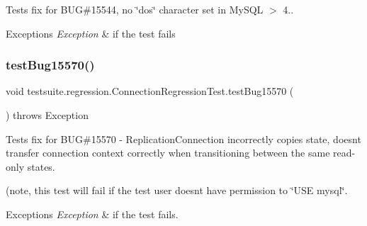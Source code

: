 Tests fix for B\+UG\#15544, no \char`\"{}dos\char`\"{} character set in My\+S\+QL $>$ 4..


\begin{DoxyExceptions}{Exceptions}
{\em Exception} & if the test fails \\
\hline
\end{DoxyExceptions}
\mbox{\label{classtestsuite_1_1regression_1_1_connection_regression_test_a9a041d23bb6273cd7e366bede52eea56}} 
\subsubsection{\texorpdfstring{test\+Bug15570()}{testBug15570()}}
{\footnotesize\ttfamily void testsuite.\+regression.\+Connection\+Regression\+Test.\+test\+Bug15570 (\begin{DoxyParamCaption}{ }\end{DoxyParamCaption}) throws Exception}

Tests fix for B\+UG\#15570 -\/ Replication\+Connection incorrectly copies state, doesn\textquotesingle{}t transfer connection context correctly when transitioning between the same read-\/only states.

(note, this test will fail if the test user doesn\textquotesingle{}t have permission to \char`\"{}\+U\+S\+E \textquotesingle{}mysql\textquotesingle{}\char`\"{}.


\begin{DoxyExceptions}{Exceptions}
{\em Exception} & if the test fails. \\
\hline
\end{DoxyExceptions}
\mbox{\label{classtestsuite_1_1regression_1_1_connection_regression_test_a24c8f315d33aa8259b7777c43e225b24}} 
